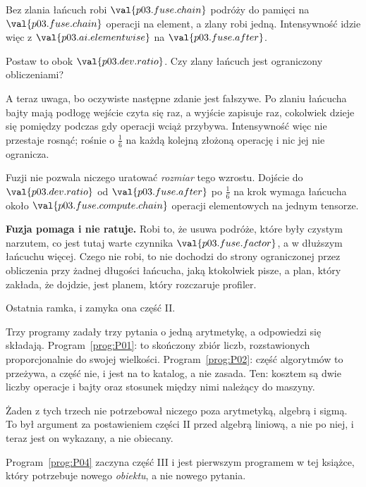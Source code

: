 \begin{fr}

Bez zlania łańcuch robi $\val{p03.fuse.chain}$ podróży do pamięci na
$\val{p03.fuse.chain}$ operacji na element, a zlany robi jedną. Intensywność
idzie więc z $\val{p03.ai.elementwise}$ na $\val{p03.fuse.after}$.

Postaw to obok $\val{p03.dev.ratio}$. Czy zlany łańcuch jest ograniczony
obliczeniami?
\dotline
\nextframe
\end{fr}

\begin{fr}

A teraz uwaga, bo oczywiste następne zdanie jest fałszywe. Po zlaniu
łańcucha bajty mają podłogę \dash{} wejście czyta się raz, a wyjście zapisuje
raz, cokolwiek dzieje się pomiędzy \dash{} podczas gdy operacji wciąż
przybywa. Intensywność więc nie przestaje rosnąć; rośnie o $\frac{1}{6}$ na
każdą kolejną złożoną operację i nic jej nie ogranicza.

Fuzji nie pozwala niczego uratować \emph{rozmiar} tego wzrostu. Dojście do
$\val{p03.dev.ratio}$ od $\val{p03.fuse.after}$ po $\frac{1}{6}$ na krok
wymaga łańcucha około $\val{p03.fuse.compute.chain}$ operacji elementowych na
jednym tensorze.

\textbf{Fuzja pomaga i nie ratuje.} Robi to, że usuwa podróże, które były
czystym narzutem, co jest tutaj warte czynnika $\val{p03.fuse.factor}$, a w
dłuższym łańcuchu więcej. Czego nie robi, to nie dochodzi do strony
ograniczonej przez obliczenia przy żadnej długości łańcucha, jaką ktokolwiek
pisze, a plan, który zakłada, że dojdzie, jest planem, który rozczaruje
profiler.
\end{fr}

\begin{fr}
Ostatnia ramka, i zamyka ona część II.

Trzy programy zadały trzy pytania o jedną arytmetykę, a odpowiedzi się
składają. Program~\ref{prog:P01}: to skończony zbiór liczb, rozstawionych
proporcjonalnie do swojej wielkości. Program~\ref{prog:P02}: część algorytmów
to przeżywa, a część nie, i jest na to katalog, a nie zasada. Ten: kosztem są
dwie liczby \dash{} operacje i bajty \dash{} oraz stosunek między nimi
należący do maszyny.

Żaden z tych trzech nie potrzebował niczego poza arytmetyką, algebrą i sigmą.
To był argument za postawieniem części II przed algebrą liniową, a nie po niej,
i teraz jest on wykazany, a nie obiecany.

Program~\ref{prog:P04} zaczyna część III i jest pierwszym programem w tej
książce, który potrzebuje nowego \emph{obiektu}, a nie nowego pytania.
\end{fr}

